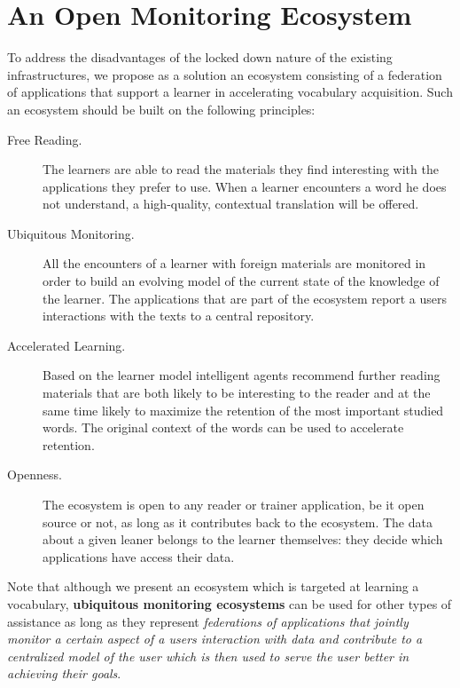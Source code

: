 

\section {An Open Monitoring Ecosystem}

To address the disadvantages of the locked down nature of the existing infrastructures, we propose as a solution an ecosystem consisting of a federation of applications that support a learner in accelerating vocabulary acquisition. Such an ecosystem should be built on the following principles:

\begin{description}

	\item [Free Reading.] The learners are able to read the materials they find interesting with the applications they prefer to use. When a learner encounters a word he does not understand, a high-quality, contextual translation will be offered.

	\item [Ubiquitous Monitoring.] All the encounters of a learner with foreign materials are monitored in order to build an evolving model of the current state of the knowledge of the learner. The applications that are part of the ecosystem report a users interactions with the texts to a central repository.

	\item [Accelerated Learning.] Based on the learner model intelligent agents recommend further reading materials that are both likely to be interesting to the reader and at the same time likely to maximize the retention of the most important studied words. 
	The original context of the words can be used to accelerate retention.

	\item [Openness.] The ecosystem is open to any reader or trainer application, be it open source or not, as long as it contributes back to the ecosystem. The data about a given leaner belongs to the learner themselves: they decide which applications have access their data.

\end{description}

Note that although we present an ecosystem which is targeted at learning a vocabulary, {\bf ubiquitous monitoring ecosystems} can be used for other types of assistance as long as they represent {\em federations of applications that jointly monitor a certain aspect of a users interaction with data and contribute to a centralized model of the user which is then used to serve the user better in achieving their goals}.

